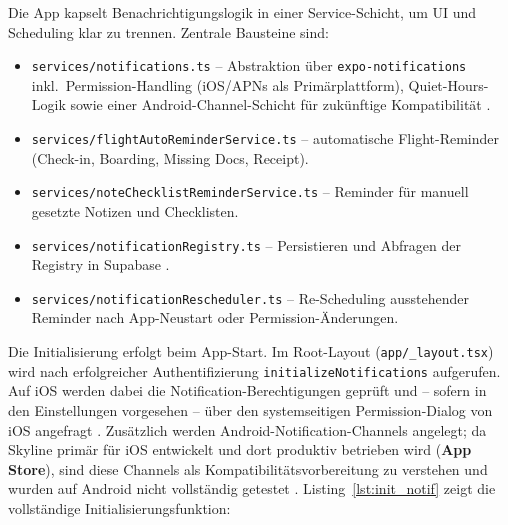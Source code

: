 Die App kapselt Benachrichtigungslogik in einer Service-Schicht,
um UI und Scheduling klar zu trennen. Zentrale Bausteine sind:

\begin{itemize}
  \item \texttt{services/notifications.ts} -- Abstraktion über \texttt{expo-notifications}
        inkl.\ Permission-Handling (iOS/APNs als Primärplattform), Quiet-Hours-Logik
        sowie einer Android-Channel-Schicht für zukünftige Kompatibilität
        \cite{expoNotificationsSDK,appleLocalNotif}.
  \item \texttt{services/flightAutoReminderService.ts} -- automatische Flight-Reminder
        (Check-in, Boarding, Missing Docs, Receipt).
  \item \texttt{services/noteChecklistReminderService.ts} -- Reminder für manuell gesetzte
        Notizen und Checklisten.
  \item \texttt{services/notificationRegistry.ts} -- Persistieren und Abfragen der Registry
        in Supabase \cite{supabaseSecuringApi}.
  \item \texttt{services/notificationRescheduler.ts} -- Re-Scheduling ausstehender Reminder
        nach App-Neustart oder Permission-Änderungen.
\end{itemize}

Die Initialisierung erfolgt beim App-Start.
Im Root-Layout (\texttt{app/\_layout.tsx}) wird nach erfolgreicher Authentifizierung
\texttt{initializeNotifications} aufgerufen.
Auf iOS werden dabei die Notification-Berechtigungen geprüft und -- sofern in den
Einstellungen vorgesehen -- über den systemseitigen Permission-Dialog von iOS angefragt
\cite{expoNotificationsSDK,appleLocalNotif}.
Zusätzlich werden Android-Notification-Channels angelegt; da Skyline primär für iOS
entwickelt und dort produktiv betrieben wird (\textbf{App Store}), sind diese Channels
als Kompatibilitätsvorbereitung zu verstehen und wurden auf Android nicht vollständig getestet
\cite{androidNotifChannels}.
Listing~\ref{lst:init_notif} zeigt die vollständige Initialisierungsfunktion:

